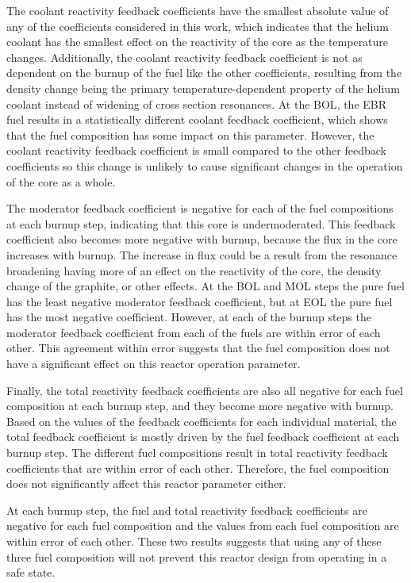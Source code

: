 The coolant reactivity feedback coefficients have the smallest absolute 
value of any of the coefficients considered in this work, which 
indicates that the helium coolant has the smallest effect on the reactivity 
of the core as the temperature changes. Additionally, the coolant 
reactivity feedback coefficient is not as dependent on the burnup of the 
fuel like the other coefficients, resulting from the density change 
being the primary temperature-dependent property of the helium coolant 
instead of widening of cross section resonances. 
At the \gls{BOL}, the \gls{EBR} fuel results in a statistically different 
coolant feedback coefficient, which shows that the fuel composition has some 
impact on this parameter. However, the coolant reactivity feedback 
coefficient is small compared to the other feedback coefficients so this 
change is unlikely to cause significant changes in the operation of the 
core as a whole. 

The moderator feedback coefficient is negative for each of the fuel 
compositions at each burnup step, indicating that this core is 
undermoderated. This feedback coefficient also becomes more 
negative with burnup, because the flux in the core increases with 
burnup. The increase in flux could be a result from the resonance 
broadening having more of an effect on the reactivity of the core, the 
density change of the graphite, or other effects. At the \gls{BOL} and 
\gls{MOL} steps the pure fuel has the least negative moderator 
feedback coefficient, but at \gls{EOL} the pure fuel has the most 
negative coefficient. However, at each of the burnup steps the moderator 
feedback coefficient from each of the fuels are within error of each 
other. This agreement within error suggests that the fuel composition 
does not have a significant effect on this reactor operation parameter. 

Finally, the total reactivity feedback coefficients are also all negative 
for each fuel composition at each burnup step, and they become more 
negative with burnup. Based on the values of the feedback 
coefficients for each individual material, the total feedback coefficient 
is mostly driven by the fuel feedback coefficient at each burnup step. 
The different fuel compositions result in total reactivity feedback 
coefficients that are within error of each other. Therefore, the fuel 
composition does not significantly affect this reactor parameter either. 

At each burnup step, the fuel and total reactivity feedback coefficients are 
negative for each fuel composition and the values from each fuel composition 
are within error of each other. These two results suggests that using any 
of these three fuel composition will not prevent this reactor design from 
operating in a safe state. 